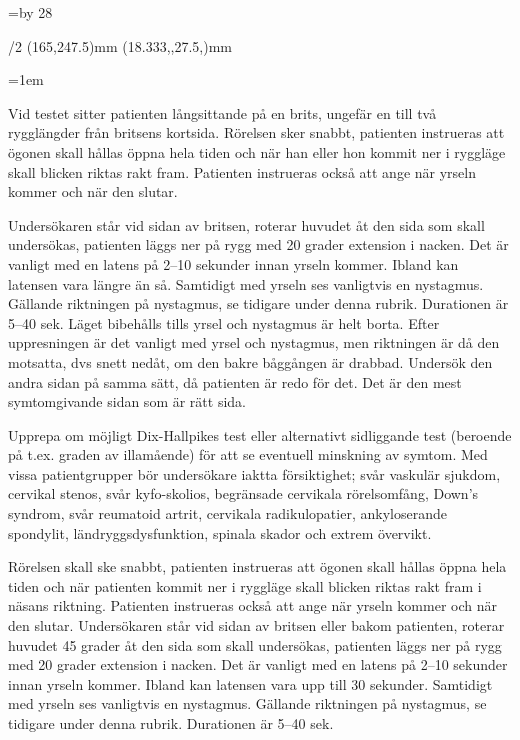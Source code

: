 \fontfam[dante]
\typosize[12/16.1]
\svlang

\hsize=110mm
\vsize=\topskip \advance\vsize by 28\baselineskip\relax

\margins/2 (165,247.5)mm (18.333,,27.5,)mm

\parskip=0pt
\parindent=1em

\baselineskip
\noindent
Vid testet sitter patienten långsittande på en brits, ungefär en till två rygglängder från britsens kortsida. Rörelsen sker snabbt, patienten instrueras att ögonen skall hållas öppna hela tiden och när han eller hon kommit ner i ryggläge skall blicken riktas rakt fram. Patienten instrueras också att ange när yrseln kommer och när den slutar. 

Undersökaren står vid sidan av britsen, roterar huvudet åt den sida som skall undersökas, patienten läggs ner på rygg med 20 grader extension i nacken. Det är vanligt med en latens på 2–10 sekunder innan yrseln kommer. Ibland kan latensen vara längre än så. 
Samtidigt med yrseln ses vanligtvis en nystagmus. Gällande riktningen på nystagmus, se tidigare under denna rubrik. Durationen är 5–40 sek. Läget bibehålls tills yrsel och nystagmus är helt borta. Efter uppresningen är det vanligt med yrsel och nystagmus, men riktningen är då den motsatta, dvs snett nedåt, om den bakre båggången är drabbad. Undersök den andra sidan på samma sätt, då patienten är redo för det. 
Det är den mest symtomgivande sidan som är rätt sida. 

Upprepa om möjligt Dix-Hallpikes test eller alternativt sidliggande test (beroende på t.ex. graden av illamående) för att se eventuell minskning av symtom. Med vissa patientgrupper bör undersökare iaktta försiktighet; svår vaskulär sjukdom, cervikal stenos, svår kyfo-skolios, begränsade cervikala rörelsomfång, Down’s syndrom, svår reumatoid artrit, cervikala radikulopatier, ankyloserande spondylit, ländryggsdysfunktion, spinala skador och extrem övervikt.

Rörelsen skall ske snabbt, patienten instrueras att ögonen skall hållas öppna hela tiden och när patienten kommit ner i ryggläge skall blicken riktas rakt fram i näsans riktning. Patienten instrueras också att ange när yrseln kommer och när den slutar. Undersökaren står vid sidan av britsen eller bakom patienten, roterar huvudet 45 grader åt den sida som skall undersökas, patienten läggs ner på rygg med 20 grader extension i nacken. Det är vanligt med en latens på 2–10 sekunder innan yrseln kommer. Ibland kan latensen vara upp till 30 sekunder. 
Samtidigt med yrseln ses vanligtvis en nystagmus. Gällande riktningen på nystagmus, se tidigare under denna rubrik. Durationen är 5–40 sek. 

